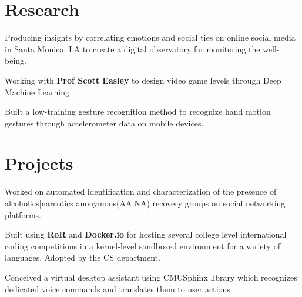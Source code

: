 \documentclass[]{deedy-resume-openfont}
\begin{document}
\begin{minipage}[t]{0.66\textwidth}


\section{Research}
Producing insights by correlating emotions and social ties on online social media in Santa Monica, LA to create a digital observatory for monitoring the well-being.
\sectionsep

Working with \textbf{Prof Scott Easley} to design video game levels through Deep Machine Learning
\sectionsep


Built a low-training gesture recognition method to recognize hand motion gestures through accelerometer data on mobile devices.

\section{Projects}
Worked on automated identification and characterization of the presence of alcoholics|narcotics anonymous(AA|NA) recovery groups on social networking platforms.
\sectionsep

Built using \textbf{RoR} and \textbf{Docker.io} for hosting several college level international coding competitions in a kernel-level sandboxed environment for a variety of languages. Adopted by the CS department.
\sectionsep

Conceived a virtual desktop assistant using CMUSphinx library which recognizes dedicated voice commands and translates them to user actions.
\sectionsep




\end{minipage}
\end{document}
